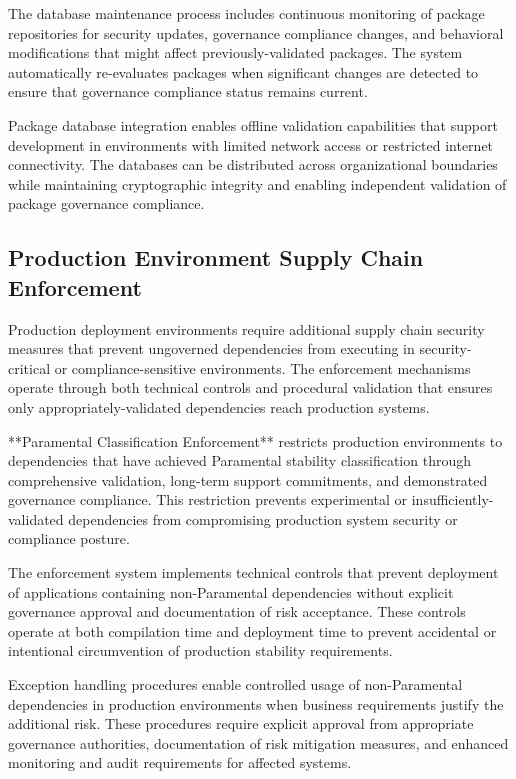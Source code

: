 The database maintenance process includes continuous monitoring of package repositories for security updates, governance compliance changes, and behavioral modifications that might affect previously-validated packages. The system automatically re-evaluates packages when significant changes are detected to ensure that governance compliance status remains current.

Package database integration enables offline validation capabilities that support development in environments with limited network access or restricted internet connectivity. The databases can be distributed across organizational boundaries while maintaining cryptographic integrity and enabling independent validation of package governance compliance.

\subsection{Production Environment Supply Chain Enforcement}

Production deployment environments require additional supply chain security measures that prevent ungoverned dependencies from executing in security-critical or compliance-sensitive environments. The enforcement mechanisms operate through both technical controls and procedural validation that ensures only appropriately-validated dependencies reach production systems.

**Paramental Classification Enforcement** restricts production environments to dependencies that have achieved Paramental stability classification through comprehensive validation, long-term support commitments, and demonstrated governance compliance. This restriction prevents experimental or insufficiently-validated dependencies from compromising production system security or compliance posture.

The enforcement system implements technical controls that prevent deployment of applications containing non-Paramental dependencies without explicit governance approval and documentation of risk acceptance. These controls operate at both compilation time and deployment time to prevent accidental or intentional circumvention of production stability requirements.

Exception handling procedures enable controlled usage of non-Paramental dependencies in production environments when business requirements justify the additional risk. These procedures require explicit approval from appropriate governance authorities, documentation of risk mitigation measures, and enhanced monitoring and audit requirements for affected systems.

